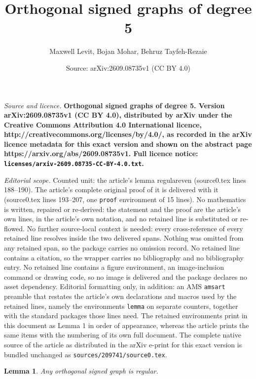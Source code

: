 \documentclass[10pt,a4paper]{amsart}
\title{\bf{\LARGE Orthogonal signed graphs of degree 5}}
\author{Maxwell Levit, Bojan Mohar, Behruz Tayfeh-Rezaie}
\date{Source: arXiv:2609.08735v1 (CC BY 4.0)}
\newtheorem{lemma}{Lemma}
\begin{document}
\maketitle

\noindent\emph{Source and licence.} \bf{\LARGE Orthogonal signed graphs of degree 5}. Version arXiv:2609.08735v1 (CC BY 4.0), distributed by arXiv under the Creative Commons Attribution 4.0 International licence, http://creativecommons.org/licenses/by/4.0/, as recorded in the arXiv licence metadata for this exact version and shown on the abstract page https://arxiv.org/abs/2609.08735v1. Full licence notice: \texttt{licenses/arxiv-2609.08735-CC-BY-4.0.txt}.\par\smallskip

\noindent\textit{Editorial scope.} Counted unit: the article's lemma regulareven (source0.tex lines 188--190). The article's complete original proof of it is delivered with it (source0.tex lines 193--207, one \texttt{proof} environment of 15 lines). No mathematics is written, repaired or re-derived: the statement and the proof are the article's own lines, in the article's own notation, and no retained line is substituted or re-flowed.  No further source-local context is needed: every cross-reference of every retained line resolves inside the two delivered spans.  Nothing was omitted from any retained span, so the package carries no omission record.  No retained line contains a citation, so the wrapper carries no bibliography and no bibliography entry.  No retained line contains a figure environment, an image-inclusion command or drawing code, so no image is delivered and the package declares no asset dependency.  Editorial formatting only, in addition: an AMS \texttt{amsart} preamble that restates the article's own declarations and macros used by the retained lines, namely the environments \texttt{lemma} on separate counters, together with the standard packages those lines need.  The retained environments print in this document as Lemma 1 in order of appearance, whereas the article prints the same items with the numbering of its own full document.  The complete native source of the article as distributed in the arXiv e-print for this exact version is bundled unchanged as \texttt{sources/209741/source0.tex}.
\begin{lemma}\label{regulareven}
Any orthogonal signed graph is regular.
\end{lemma}
\end{document}
